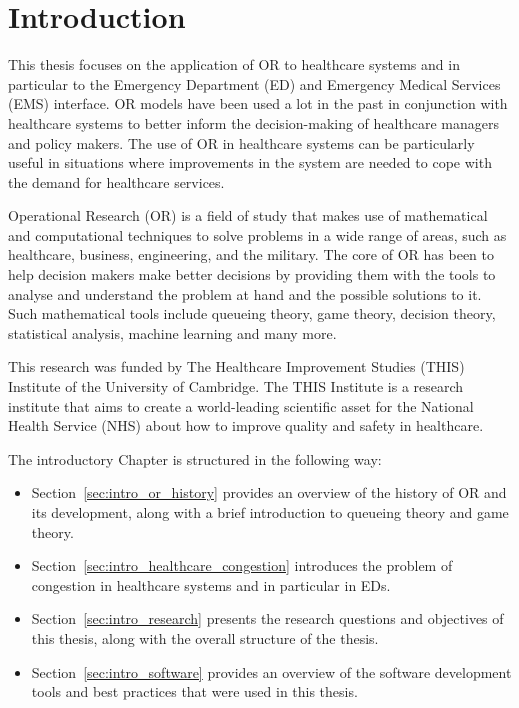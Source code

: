 \chapter{Introduction}\label{sec:introduction}

This thesis focuses on the application of OR to healthcare systems and in
particular to the Emergency Department (ED) and Emergency Medical Services
(EMS) interface.
OR models have been used a lot in the past in conjunction with healthcare
systems to better inform the decision-making of healthcare managers and
policy makers.
The use of OR in healthcare systems can be particularly useful in situations
where improvements in the system are needed to cope with the demand for
healthcare services.

Operational Research (OR) is a field of study that makes use of mathematical
and computational techniques to solve problems in a wide range of areas, such
as healthcare, business, engineering, and the military.
The core of OR has been to help decision makers make better decisions by
providing them with the tools to analyse and understand the problem at hand and
the possible solutions to it.
Such mathematical tools include queueing theory, game theory, decision theory,
statistical analysis, machine learning and many more.

This research was funded by The Healthcare Improvement Studies (THIS) Institute
of the University of Cambridge.
The THIS Institute is a research institute that aims to create a world-leading
scientific asset for the National Health Service (NHS) about how to improve
quality and safety in healthcare.

The introductory Chapter is structured in the following way:
\begin{itemize}
    \item Section~\ref{sec:intro_or_history} provides an overview of the
    history of OR and its development, along with a brief introduction to
    queueing theory and game theory.
    \item Section~\ref{sec:intro_healthcare_congestion} introduces the problem
    of congestion in healthcare systems and in particular in EDs.
    \item Section~\ref{sec:intro_research} presents the research questions and
    objectives of this thesis, along with the overall structure of the thesis.
    \item Section~\ref{sec:intro_software} provides an overview of the software
    development tools and best practices that were used in this thesis.
\end{itemize}


